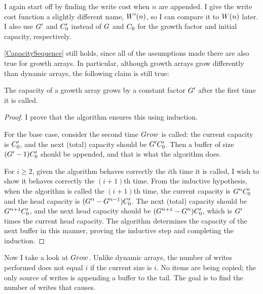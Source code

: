 \HdrGrowthArrayImpl

\HdrTimeComplex

I again start off by finding the write cost when $n$ are appended. I give the write cost function a slightly different name, $W'(n)$, so I can compare it to $W(n)$ later. I also use $G'$ and $C_0'$ instead of $G$ and $C_0$ for the growth factor and initial capacity, respectively.

\ref{CapacitySequence} still holds, since all of the assumptions made there are also true for growth arrays. In particular, although growth arrays grow differently than dynamic arrays, the following claim is still true:

\begin{lemma}
	The capacity of a growth array grows by a constant factor $G'$ after the first time it is called.
\end{lemma}

\begin{proof}
	I prove that the algorithm ensures this using induction.
	
	For the base case, consider the second time $Grow$ is called: the current capacity is $C_0'$, and the next (total) capacity should be $G'C_0'$. Then a buffer of size $(G' - 1)C_0'$ should be appended, and that is what the algorithm does.
	
	For $i \geq 2$, given the algorithm behaves correctly the $i$th time it is called, I wish to show it behaves correctly the $(i + 1)$th time. From the inductive hypothesis, when the algorithm is called the $(i + 1)$th time, the current capacity is $G'^iC_0'$ and the head capacity is $(G'^i - G'^{i - 1})C_0'$. The next (total) capacity should be $G'^{i + 1}C_0'$, and the next head capacity should be $(G'^{i + 1} - G'^i)C_0'$, which is $G'$ times the current head capacity. The algorithm determines the capacity of the next buffer in this manner, proving the inductive step and completing the induction.
\end{proof}

Now I take a look at $Grow$. Unlike dynamic arrays, the number of writes performed does not equal $i$ if the current size is $i$. No items are being copied; the only source of writes is appending a buffer to the tail. The goal is to find the number of writes that causes.

